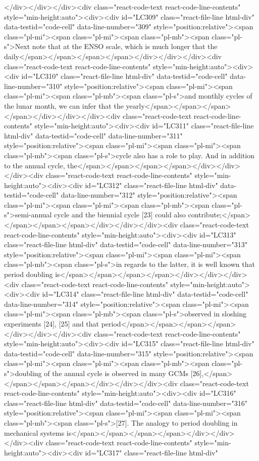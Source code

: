 {{{{</div></div></div><div class="react-code-text react-code-line-contents" style="min-height:auto"><div><div id="LC309" class="react-file-line html-div" data-testid="code-cell" data-line-number="309" style="position:relative"><span class="pl-mi"><span class="pl-mi"><span class="pl-mb"><span class="pl-s">Next note that at the ENSO scale, which is much longer that the daily</span></span></span></span></div></div></div><div class="react-code-text react-code-line-contents" style="min-height:auto"><div><div id="LC310" class="react-file-line html-div" data-testid="code-cell" data-line-number="310" style="position:relative"><span class="pl-mi"><span class="pl-mi"><span class="pl-mb"><span class="pl-s">and monthly cycles of the lunar month, we can infer that the yearly</span></span></span></span></div></div></div><div class="react-code-text react-code-line-contents" style="min-height:auto"><div><div id="LC311" class="react-file-line html-div" data-testid="code-cell" data-line-number="311" style="position:relative"><span class="pl-mi"><span class="pl-mi"><span class="pl-mb"><span class="pl-s">cycle also has a role to play. And in addition to the annual cycle, the</span></span></span></span></div></div></div><div class="react-code-text react-code-line-contents" style="min-height:auto"><div><div id="LC312" class="react-file-line html-div" data-testid="code-cell" data-line-number="312" style="position:relative"><span class="pl-mi"><span class="pl-mi"><span class="pl-mb"><span class="pl-s">semi-annual cycle and the biennial cycle {[}23{]} could also contribute;</span></span></span></span></div></div></div><div class="react-code-text react-code-line-contents" style="min-height:auto"><div><div id="LC313" class="react-file-line html-div" data-testid="code-cell" data-line-number="313" style="position:relative"><span class="pl-mi"><span class="pl-mi"><span class="pl-mb"><span class="pl-s">in regards to the latter, it is well known that period doubling is</span></span></span></span></div></div></div><div class="react-code-text react-code-line-contents" style="min-height:auto"><div><div id="LC314" class="react-file-line html-div" data-testid="code-cell" data-line-number="314" style="position:relative"><span class="pl-mi"><span class="pl-mi"><span class="pl-mb"><span class="pl-s">observed in sloshing experiments {[}24{]}, {[}25{]} and that period</span></span></span></span></div></div></div><div class="react-code-text react-code-line-contents" style="min-height:auto"><div><div id="LC315" class="react-file-line html-div" data-testid="code-cell" data-line-number="315" style="position:relative"><span class="pl-mi"><span class="pl-mi"><span class="pl-mb"><span class="pl-s">doubling of the annual cycle is observed in many GCMs {[}26{]},</span></span></span></span></div></div></div><div class="react-code-text react-code-line-contents" style="min-height:auto"><div><div id="LC316" class="react-file-line html-div" data-testid="code-cell" data-line-number="316" style="position:relative"><span class="pl-mi"><span class="pl-mi"><span class="pl-mb"><span class="pl-s">{[}27{]}. The analogy to period doubling in mechanical systems is</span></span></span></span></div></div></div><div class="react-code-text react-code-line-contents" style="min-height:auto"><div><div id="LC317" class="react-file-line html-div" }}}}
